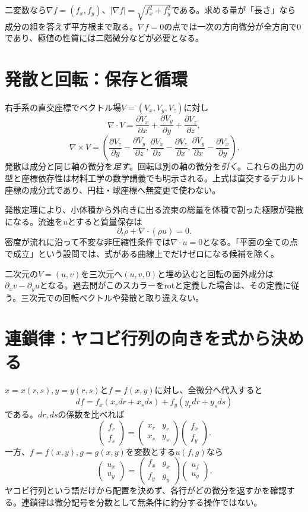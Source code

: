 二変数なら$\nabla f=(f_x,f_y)$、$|\nabla f|=\sqrt{f_x^2+f_y^2}$である。求める量が「長さ」なら成分の組を答えず平方根まで取る。$\nabla f=0$の点では一次の方向微分が全方向で0であり、極値の性質には二階微分などが必要となる。

\section{発散と回転：保存と循環}
\label{theory:analysis:divcurl}
右手系の直交座標でベクトル場$V=(V_x,V_y,V_z)$に対し
\[
 \nabla\cdot V=\frac{\partial V_x}{\partial x}
 +\frac{\partial V_y}{\partial y}+\frac{\partial V_z}{\partial z},
\]
\[
 \nabla\times V=
 \left(\frac{\partial V_z}{\partial y}-\frac{\partial V_y}{\partial z},
 \frac{\partial V_x}{\partial z}-\frac{\partial V_z}{\partial x},
 \frac{\partial V_y}{\partial x}-\frac{\partial V_x}{\partial y}\right).
\]
発散は成分と同じ軸の微分を\emph{足す}。回転は別の軸の微分を\emph{引く}。これらの出力の型と座標依存性は材料工学の数学講義でも明示される\parencite{mit_vectorcalc2005}。上式は直交するデカルト座標の成分式であり、円柱・球座標へ無変更で使わない。

発散定理により、小体積から外向きに出る流束の総量を体積で割った極限が発散になる。流速を$u$とすると質量保存は
\[
 \partial_t\rho+\nabla\cdot(\rho u)=0.
\]
密度が流れに沿って不変な非圧縮性条件では$\nabla\cdot u=0$となる。「平面の全ての点で成立」という設問では、式がある曲線上でだけゼロになる候補を除く。

二次元の$V=(u,v)$を三次元へ$(u,v,0)$と埋め込むと回転の面外成分は$\partial_xv-\partial_yu$となる。過去問がこのスカラーをrotと定義した場合は、その定義に従う。三次元での回転ベクトルや発散と取り違えない。

\section{連鎖律：ヤコビ行列の向きを式から決める}
\label{theory:analysis:chain}
$x=x(r,s),y=y(r,s)$と$f=f(x,y)$に対し、全微分へ代入すると
\[
 df=f_x(x_rdr+x_sds)+f_y(y_rdr+y_sds)
\]
である。$dr,ds$の係数を比べれば
\[
 \begin{pmatrix}f_r\\f_s\end{pmatrix}
 =\begin{pmatrix}x_r&y_r\\x_s&y_s\end{pmatrix}
 \begin{pmatrix}f_x\\f_y\end{pmatrix}.
\]
一方、$f=f(x,y),g=g(x,y)$を変数とする$u(f,g)$なら
\[
 \begin{pmatrix}u_x\\u_y\end{pmatrix}
 =\begin{pmatrix}f_x&g_x\\f_y&g_y\end{pmatrix}
 \begin{pmatrix}u_f\\u_g\end{pmatrix}.
\]
ヤコビ行列という語だけから配置を決めず、各行がどの微分を返すかを確認する。連鎖律は微分記号を分数として無条件に約分する操作ではない\parencite{mit_chain2007}。

